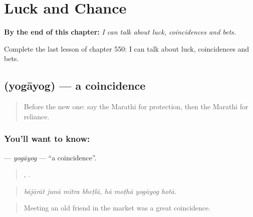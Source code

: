 
\chapter{Luck and Chance}
\label{ch:mr-luck-and-chance}

\begin{chapteropening}
\textbf{By the end of this chapter:} \emph{I can talk about luck, coincidences and bets.}

Complete the last lesson of chapter 550: I can talk about luck, coincidences and bets.
\end{chapteropening}

\section[\texorpdfstring{\mr{योगायोग} (yogāyog)}{योगायोग (yogāyog)}]{ (yogāyog) — a coincidence}

\label{lesson:MR-C550-yogayog}



\begin{quote}
Before the new one: say the Marathi for protection, then the Marathi for reliance.
\end{quote}

\subsection*{You'll want to know: }
\textbf{} — \emph{yogāyog} — \textquotedblleft{}a coincidence\textquotedblright{}.

\begin{quote}
   ,    .
\end{quote}

\begin{quote}
\emph{bājārāt junā mitra bheṭlā, hā moṭhā yogāyog hotā.}
\end{quote}

\begin{quote}
Meeting an old friend in the market was a great coincidence.
\end{quote}

